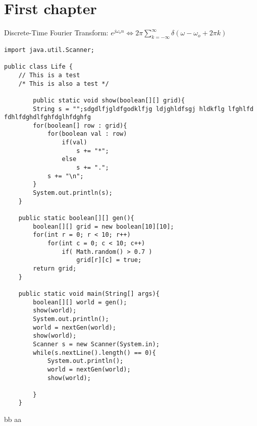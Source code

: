 \chapter{First chapter}
Discrete-Time Fourier Transform: 
$e^{j\omega _o n} \Leftrightarrow 2\pi \sum\limits_{k = - \infty }^\infty {\delta (\omega - \omega _o + 2\pi k)}$

\begin{lstlisting}
import java.util.Scanner;

public class Life {
    // This is a test
    /* This is also a test */
    
		public static void show(boolean[][] grid){
        String s = "";sdgdlfjgldfgodklfjg ldjghldfsgj hldkflg lfghlfd fdhlfdghdlfghfdglhfdghfg
        for(boolean[] row : grid){
            for(boolean val : row)
                if(val)
                    s += "*";
                else
                    s += ".";
            s += "\n";
        }
        System.out.println(s);
    }
    
    public static boolean[][] gen(){
        boolean[][] grid = new boolean[10][10];
        for(int r = 0; r < 10; r++)
            for(int c = 0; c < 10; c++)
                if( Math.random() > 0.7 )
                    grid[r][c] = true;
        return grid;
    }
    
    public static void main(String[] args){
        boolean[][] world = gen();
        show(world);
        System.out.println();
        world = nextGen(world);
        show(world);
        Scanner s = new Scanner(System.in);
        while(s.nextLine().length() == 0){
            System.out.println();
            world = nextGen(world);
            show(world);
            
        }
    }
\end{lstlisting}bb
aa